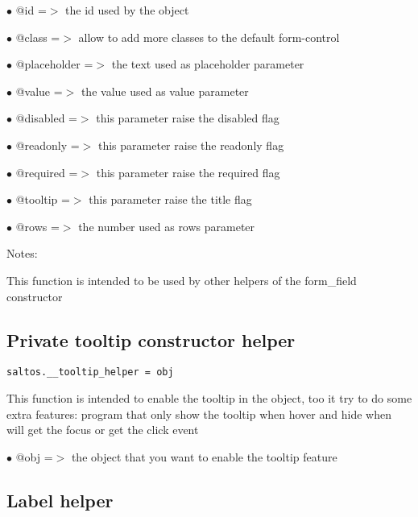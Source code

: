 \documentclass[a4paper]{book}
\begin{document}
\begin{compactitem}
\item[\color{myblue}$\bullet$] @id          =$>$ the id used by the object
\item[\color{myblue}$\bullet$] @class       =$>$ allow to add more classes to the default form-control
\item[\color{myblue}$\bullet$] @placeholder =$>$ the text used as placeholder parameter
\item[\color{myblue}$\bullet$] @value       =$>$ the value used as value parameter
\item[\color{myblue}$\bullet$] @disabled    =$>$ this parameter raise the disabled flag
\item[\color{myblue}$\bullet$] @readonly    =$>$ this parameter raise the readonly flag
\item[\color{myblue}$\bullet$] @required    =$>$ this parameter raise the required flag
\item[\color{myblue}$\bullet$] @tooltip     =$>$ this parameter raise the title flag
\item[\color{myblue}$\bullet$] @rows        =$>$ the number used as rows parameter
\end{compactitem}

Notes:

This function is intended to be used by other helpers of the form\_field constructor

\hypertarget{toc407}{}
\subsection{Private tooltip constructor helper}

\begin{lstlisting}
saltos.__tooltip_helper = obj
\end{lstlisting}

This function is intended to enable the tooltip in the object, too it try to do some
extra features: program that only show the tooltip when hover and hide when will get
the focus or get the click event

\begin{compactitem}
\item[\color{myblue}$\bullet$] @obj =$>$ the object that you want to enable the tooltip feature
\end{compactitem}

\hypertarget{toc408}{}
\subsection{Label helper}
\end{document}

